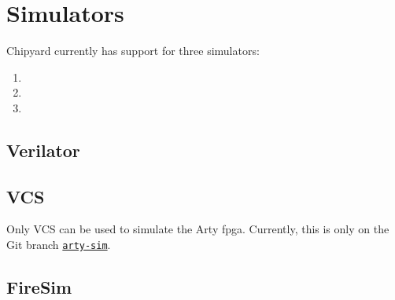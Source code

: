 \chapter{Simulators}\label{chap:Simulators}
Chipyard currently has support for three simulators:
\begin{enumerate}
\item {}
\item {}
\item {}
\end{enumerate}


\section{Verilator}\label{sec:Verilator_Simulator}

\section{VCS}\label{sec:VCS_Simulator}
Only VCS can be used to simulate the Arty \Gls{fpga}.
Currently, this is only on the Git branch \href{https://github.com/ucb-bar/chipyard/tree/arty-sim}{\texttt{arty-sim}}.

\section{FireSim}\label{sec:FireSim_Simulator}
\nocite{firesimPresentation}

